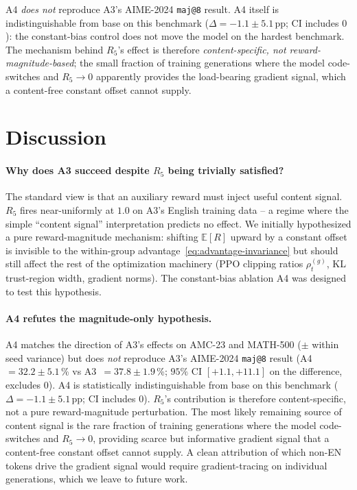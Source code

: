 \documentclass[11pt]{article}
\newcommand{\armC}{\textsc{A3}}
\newcommand{\armD}{\textsc{A4}}
\newcommand{\R}[1]{R_{#1}}
\newcommand{\E}{\mathbb{E}}
\begin{document}
\armD{} \emph{does not} reproduce \armC{}'s AIME-2024 \texttt{maj@8}
result. \armD{} itself is indistinguishable from base on this benchmark
($\Delta = -1.1 \pm 5.1$\,pp; CI includes $0$): the constant-bias
control does not move the model on the hardest benchmark. The
mechanism behind $\R{5}$'s effect is therefore \emph{content-specific,
not reward-magnitude-based}; the small fraction of training generations
where the model code-switches and $\R{5} \to 0$ apparently provides
the load-bearing gradient signal, which a content-free constant offset
cannot supply.

\section{Discussion}
\label{sec:discussion}

\paragraph{Why does \armC{} succeed despite $\R{5}$ being trivially
satisfied?}
The standard view is that an auxiliary reward must inject useful
content signal. $\R{5}$ fires near-uniformly at $1.0$ on \armC{}'s
English training data -- a regime where the simple ``content signal''
interpretation predicts no effect. We initially hypothesized a pure
reward-magnitude mechanism: shifting $\E[R]$ upward by a constant
offset is invisible to the within-group advantage~\eqref{eq:advantage-invariance}
but should still affect the rest of the optimization machinery
(PPO clipping ratios $\rho_t^{(g)}$, KL trust-region width, gradient
norms). The constant-bias ablation \armD{} was designed to test this
hypothesis.

\paragraph{\armD{} refutes the magnitude-only hypothesis.}
\armD{} matches the direction of \armC{}'s effects on AMC-23 and
MATH-500 ($\pm$ within seed variance) but does \emph{not} reproduce
\armC{}'s AIME-2024 \texttt{maj@8} result (\armD{}~$=32.2 \pm 5.1$\,\%
vs \armC{}~$=37.8 \pm 1.9$\,\%; $95\%$ CI $[+1.1, +11.1]$ on the
difference, excludes $0$). \armD{} is statistically
indistinguishable from base on this benchmark
($\Delta = -1.1 \pm 5.1$\,pp; CI includes $0$). $\R{5}$'s
contribution is therefore content-specific, not a pure
reward-magnitude perturbation. The most likely remaining source of
content signal is the rare fraction of training generations where the
model code-switches and $\R{5} \to 0$, providing scarce but
informative gradient signal that a content-free constant offset cannot
supply. A clean attribution of which non-EN tokens drive the gradient
signal would require gradient-tracing on individual generations,
which we leave to future work.
\end{document}
